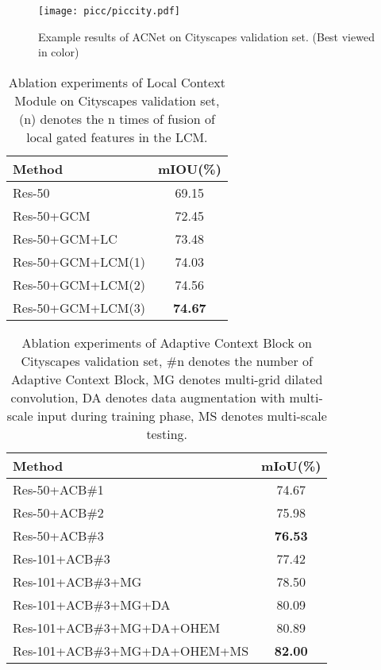 \documentclass[10pt,twocolumn,letterpaper]{article}
\begin{document}
\begin{figure*}[!t]
        \centering
        \texttt{[image: picc/piccity.pdf]}
  \caption{Example results of ACNet on Cityscapes validation set. (Best viewed in color)}
         \label{SPAM}
        \vspace{-1em}    
  
\end{figure*}


\begin{table}[t]
\begin{center}
\begin{tabular}{l|c}
\toprule
Method & mIOU(\%)\\
\hline
\hline
 \noalign{\smallskip}
Res-50 & 69.15\\
Res-50+GCM & 72.45\\
Res-50+GCM+LC & 73.48\\
\hline
 \noalign{\smallskip}
Res-50+GCM+LCM(1) & 74.03\\
Res-50+GCM+LCM(2)& 74.56\\ 
Res-50+GCM+LCM(3)& \textbf{74.67}\\
\hline
\bottomrule
\end{tabular}
\end{center}
\caption{Ablation experiments of Local Context Module on Cityscapes validation set, (n)  denotes the n times of fusion of local gated features in the LCM.  }
\label{localT}
     \vspace{-1em}    
\end{table}

\begin{table}[t]
\begin{center}
\begin{tabular}{l|c}
\toprule
Method & mIoU(\%)\\
\hline
\hline
 \noalign{\smallskip}
Res-50+ACB\#1 & 74.67\\
Res-50+ACB\#2 & 75.98\\
Res-50+ACB\#3& \textbf{76.53}\\ 
\hline
 \noalign{\smallskip}
Res-101+ACB\#3 & 77.42\\
Res-101+ACB\#3+MG & 78.50\\ 
Res-101+ACB\#3+MG+DA & 80.09\\
Res-101+ACB\#3+MG+DA+OHEM &80.89\\
Res-101+ACB\#3+MG+DA+OHEM+MS &\textbf{82.00}\\
\hline

\bottomrule
\end{tabular}
\end{center}
\caption{Ablation experiments of Adaptive Context Block on Cityscapes validation set, \#n  denotes the number of Adaptive Context Block, MG denotes multi-grid dilated convolution, DA denotes data augmentation with multi-scale input during training phase, MS denotes multi-scale testing. }
\vspace{-1.2em}
\label{ACBT}
\end{table}
\end{document}
